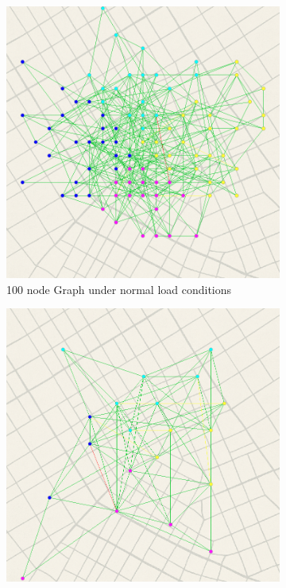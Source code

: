 \documentclass[12pt]{article}
\begin{document}
\begin{figure}[H]
    \centering
    \begin{subfigure}[b]{0.48\textwidth}
        \includegraphics[width=\textwidth]{../Images/sample_img_1_2.png}
        \caption{100 node Graph under normal load conditions}
        \label{fig:traffic-normal}
    \end{subfigure}
    \hfill
    \begin{subfigure}[b]{0.48\textwidth}
        \includegraphics[width=\textwidth]{../Images/sample_img_2_1.png}

\end{subfigure}
\end{figure}
\end{document}

